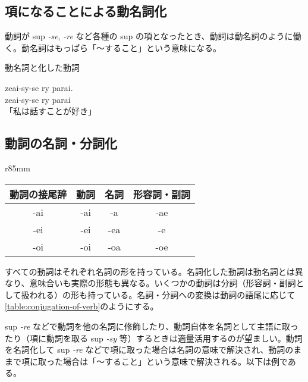 \subsection{項になることによる動名詞化}

動詞が sup \emph{-se}, \emph{-re} など各種の sup の項となったとき、動詞は動名詞のように働く。動名詞はもっぱら「～すること」という意味になる。

\begin{itembox}[l]{動名詞と化した動詞}
    \begin{pindent}
        \noindent
        zeai-sy-se ry parai. \\
        zeai-sy-se
            ry parai \\
        「私は話すことが好き」
    \end{pindent}
\end{itembox}

\subsection{動詞の名詞・分詞化}

\begin{wraptable}[8]{r}{85mm}
    \centering
    \caption{動詞の名詞・分詞化}
    \label{table:conjugation-of-verb}
    \begin{tabular}{cccc}
        \toprule
        動詞の接尾辞 & 動詞 & 名詞 & 形容詞・副詞 \\
        \midrule
        -ai & -ai & -a  & -ae \\
        -ei & -ei & -ea & -e  \\
        -oi & -oi & -oa & -oe \\
        \bottomrule
    \end{tabular}
\end{wraptable}

すべての動詞はそれぞれ名詞の形を持っている。名詞化した動詞は動名詞とは異なり、意味合いも実際の形態も異なる。いくつかの動詞は分詞（形容詞・副詞として扱われる）の形も持っている。名詞・分詞への変換は動詞の語尾に応じて\cref{table:conjugation-of-verb}のようにする。

sup \emph{-re} などで動詞を他の名詞に修飾したり、動詞自体を名詞として主語に取ったり（項に動詞を取る sup \emph{-sy} 等）するときは適量活用するのが望ましい。動詞を名詞化して sup \emph{-re} などで項に取った場合は名詞の意味で解決され、動詞のままで項に取った場合は「～すること」という意味で解決される。以下は例である。

